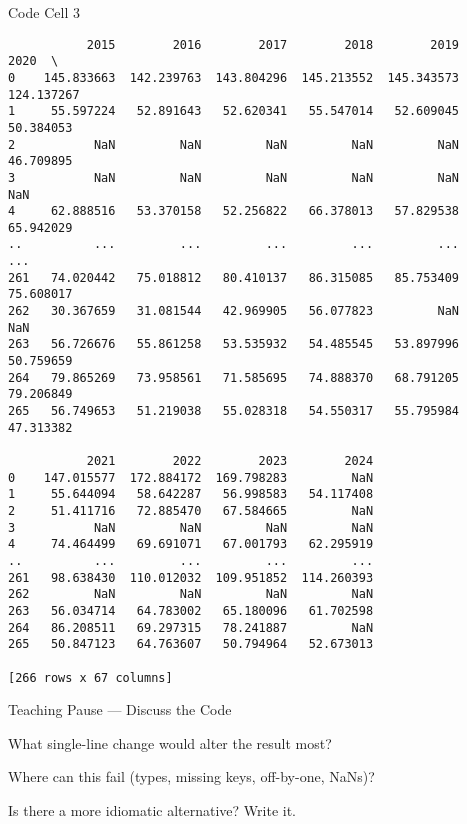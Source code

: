 \documentclass[notes,11pt, aspectratio=169, xcolor=table]{beamer}
\newenvironment{wideitemize}{\itemize\addtolength{\itemsep}{10pt}}{\enditemize}
\begin{document}
\begin{frame}[fragile]{Code Cell 3}
\begin{verbatim}
           2015        2016        2017        2018        2019        2020  \
0    145.833663  142.239763  143.804296  145.213552  145.343573  124.137267   
1     55.597224   52.891643   52.620341   55.547014   52.609045   50.384053   
2           NaN         NaN         NaN         NaN         NaN   46.709895   
3           NaN         NaN         NaN         NaN         NaN         NaN   
4     62.888516   53.370158   52.256822   66.378013   57.829538   65.942029   
..          ...         ...         ...         ...         ...         ...   
261   74.020442   75.018812   80.410137   86.315085   85.753409   75.608017   
262   30.367659   31.081544   42.969905   56.077823         NaN         NaN   
263   56.726676   55.861258   53.535932   54.485545   53.897996   50.759659   
264   79.865269   73.958561   71.585695   74.888370   68.791205   79.206849   
265   56.749653   51.219038   55.028318   54.550317   55.795984   47.313382   

           2021        2022        2023        2024  
0    147.015577  172.884172  169.798283         NaN  
1     55.644094   58.642287   56.998583   54.117408  
2     51.411716   72.885470   67.584665         NaN  
3           NaN         NaN         NaN         NaN  
4     74.464499   69.691071   67.001793   62.295919  
..          ...         ...         ...         ...  
261   98.638430  110.012032  109.951852  114.260393  
262         NaN         NaN         NaN         NaN  
263   56.034714   64.783002   65.180096   61.702598  
264   86.208511   69.297315   78.241887         NaN  
265   50.847123   64.763607   50.794964   52.673013  

[266 rows x 67 columns]
\end{verbatim}
\end{frame}

\begin{frame}{Teaching Pause — Discuss the Code}
\begin{wideitemize}
\item What single-line change would alter the result most?
\item Where can this fail (types, missing keys, off-by-one, NaNs)?
\item Is there a more idiomatic alternative? Write it.
\end{wideitemize}
\end{frame}
\end{document}
